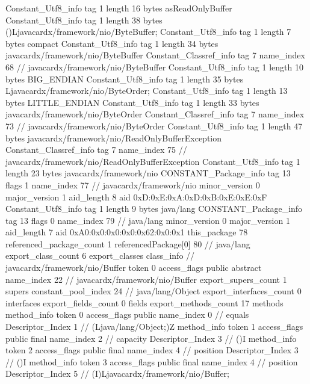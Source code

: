 {{{		}
		Constant_Utf8_info {
			tag	1
			length	16
			bytes	asReadOnlyBuffer
		}
		Constant_Utf8_info {
			tag	1
			length	38
			bytes	()Ljavacardx/framework/nio/ByteBuffer;
		}
		Constant_Utf8_info {
			tag	1
			length	7
			bytes	compact
		}
		Constant_Utf8_info {
			tag	1
			length	34
			bytes	javacardx/framework/nio/ByteBuffer
		}
		Constant_Classref_info {
			tag	7
			name_index	68		// javacardx/framework/nio/ByteBuffer
		}
		Constant_Utf8_info {
			tag	1
			length	10
			bytes	BIG_ENDIAN
		}
		Constant_Utf8_info {
			tag	1
			length	35
			bytes	Ljavacardx/framework/nio/ByteOrder;
		}
		Constant_Utf8_info {
			tag	1
			length	13
			bytes	LITTLE_ENDIAN
		}
		Constant_Utf8_info {
			tag	1
			length	33
			bytes	javacardx/framework/nio/ByteOrder
		}
		Constant_Classref_info {
			tag	7
			name_index	73		// javacardx/framework/nio/ByteOrder
		}
		Constant_Utf8_info {
			tag	1
			length	47
			bytes	javacardx/framework/nio/ReadOnlyBufferException
		}
		Constant_Classref_info {
			tag	7
			name_index	75		// javacardx/framework/nio/ReadOnlyBufferException
		}
		Constant_Utf8_info {
			tag	1
			length	23
			bytes	javacardx/framework/nio
		}
		CONSTANT_Package_info {
			tag	13
			flags	1
			name_index	77		// javacardx/framework/nio
			minor_version	0
			major_version	1
			aid_length	8
			aid	0xD:0xE:0xA:0xD:0xB:0xE:0xE:0xF
		}
		Constant_Utf8_info {
			tag	1
			length	9
			bytes	java/lang
		}
		CONSTANT_Package_info {
			tag	13
			flags	0
			name_index	79		// java/lang
			minor_version	0
			major_version	1
			aid_length	7
			aid	0xA0:0x0:0x0:0x0:0x62:0x0:0x1
		}
	}
	this_package	78
	referenced_package_count	1
	referencedPackage[0]	80		// java/lang
	export_class_count	6
	export_classes {
		class_info {		// javacardx/framework/nio/Buffer
			token	0
			access_flags	public abstract
			name_index	22		// javacardx/framework/nio/Buffer
			export_supers_count	1
			supers {
				constant_pool_index	24		// java/lang/Object
			}
			export_interfaces_count	0
			interfaces {
			}
			export_fields_count	0
			fields {
			}
			export_methods_count	17
			methods {
				method_info {
					token	0
					access_flags	public
					name_index	0		// equals
					Descriptor_Index	1		// (Ljava/lang/Object;)Z
				}
				method_info {
					token	1
					access_flags	public final
					name_index	2		// capacity
					Descriptor_Index	3		// ()I
				}
				method_info {
					token	2
					access_flags	public final
					name_index	4		// position
					Descriptor_Index	3		// ()I
				}
				method_info {
					token	3
					access_flags	public final
					name_index	4		// position
					Descriptor_Index	5		// (I)Ljavacardx/framework/nio/Buffer;
}}}}}
